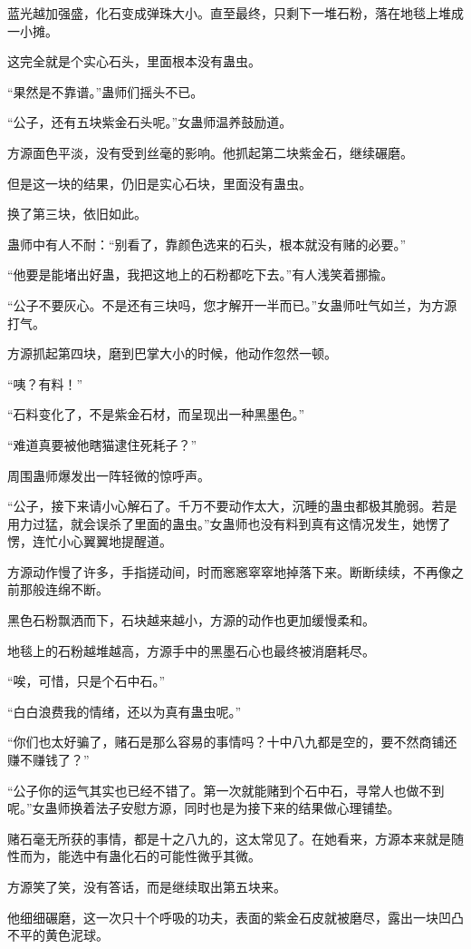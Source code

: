 \begin{this_body}
蓝光越加强盛，化石变成弹珠大小。直至最终，只剩下一堆石粉，落在地毯上堆成一小摊。

这完全就是个实心石头，里面根本没有蛊虫。

“果然是不靠谱。”蛊师们摇头不已。

“公子，还有五块紫金石头呢。”女蛊师温养鼓励道。

方源面色平淡，没有受到丝毫的影响。他抓起第二块紫金石，继续碾磨。

但是这一块的结果，仍旧是实心石块，里面没有蛊虫。

换了第三块，依旧如此。

蛊师中有人不耐：“别看了，靠颜色选来的石头，根本就没有赌的必要。”

“他要是能堵出好蛊，我把这地上的石粉都吃下去。”有人浅笑着挪揄。

“公子不要灰心。不是还有三块吗，您才解开一半而已。”女蛊师吐气如兰，为方源打气。

方源抓起第四块，磨到巴掌大小的时候，他动作忽然一顿。

“咦？有料！”

“石料变化了，不是紫金石材，而呈现出一种黑墨色。”

“难道真要被他瞎猫逮住死耗子？”

周围蛊师爆发出一阵轻微的惊呼声。

“公子，接下来请小心解石了。千万不要动作太大，沉睡的蛊虫都极其脆弱。若是用力过猛，就会误杀了里面的蛊虫。”女蛊师也没有料到真有这情况发生，她愣了愣，连忙小心翼翼地提醒道。

方源动作慢了许多，手指搓动间，时而窸窸窣窣地掉落下来。断断续续，不再像之前那般连绵不断。

黑色石粉飘洒而下，石块越来越小，方源的动作也更加缓慢柔和。

地毯上的石粉越堆越高，方源手中的黑墨石心也最终被消磨耗尽。

“唉，可惜，只是个石中石。”

“白白浪费我的情绪，还以为真有蛊虫呢。”

“你们也太好骗了，赌石是那么容易的事情吗？十中八九都是空的，要不然商铺还赚不赚钱了？”

“公子你的运气其实也已经不错了。第一次就能赌到个石中石，寻常人也做不到呢。”女蛊师换着法子安慰方源，同时也是为接下来的结果做心理铺垫。

赌石毫无所获的事情，都是十之八九的，这太常见了。在她看来，方源本来就是随性而为，能选中有蛊化石的可能性微乎其微。

方源笑了笑，没有答话，而是继续取出第五块来。

他细细碾磨，这一次只十个呼吸的功夫，表面的紫金石皮就被磨尽，露出一块凹凸不平的黄色泥球。

\end{this_body}


